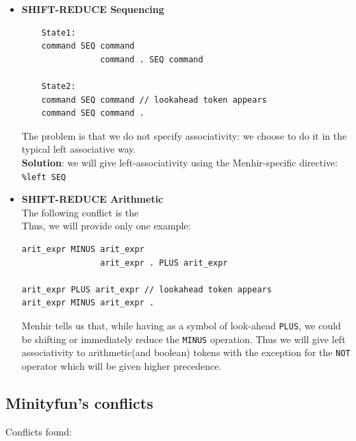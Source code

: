 \documentclass[a4paper,11pt]{report}
\begin{document}
\begin{itemize}
    \item \textbf{SHIFT-REDUCE Sequencing}
    
    \begin{lstlisting}
    State1:
    command SEQ command 
                command . SEQ command 

    State2:
    command SEQ command // lookahead token appears
    command SEQ command .
    \end{lstlisting}
    
    The problem is that we do not spec\lstset{
  language=Python, %
  basicstyle=\ttfamily\small, %
  captionpos=b, %
}ify associativity: we choose to do it in the typical left associative way.\\
    \textbf{Solution}: we will give left-associativity using the Menhir-specific directive:\\
    \verb|%left SEQ|   
    
    \item \textbf{SHIFT-REDUCE Arithmetic}\\
    The following conflict is the  \\
    Thus, we will provide only one example:
        
    \begin{lstlisting}
arit_expr MINUS arit_expr 
                arit_expr . PLUS arit_expr 
                
arit_expr PLUS arit_expr // lookahead token appears
arit_expr MINUS arit_expr .
    \end{lstlisting}
    
    Menhir tells us that, while having as a symbol of look-ahead \verb|PLUS|, we could be shifting
    or immediately reduce the \verb|MINUS| operation.
    Thus we will give left associativity to arithmetic(and boolean) tokens with the exception for the \verb|NOT| operator which will be given higher precedence.
\end{itemize}

\subsection{Minityfun's conflicts}

Conflicts found:
\end{document}
